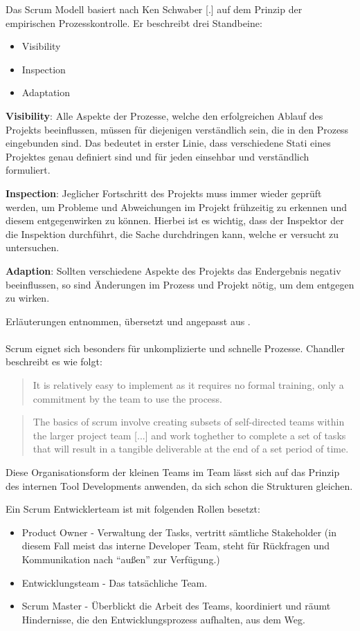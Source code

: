\documentclass[pagesize, paper=a4, fontsize=12pt, titlepage=true, headings=small, headnosepline, abstractoff, liststotoc, nochapterprefix, plainheadsepline, twoside]{scrreprt}
\begin{document}
Das Scrum Modell basiert nach Ken Schwaber [.] auf dem Prinzip der empirischen Prozesskontrolle. Er beschreibt drei Standbeine:
\begin{itemize}
\item Visibility
\item Inspection
\item Adaptation
\end{itemize}

\textbf{Visibility}: Alle Aspekte der Prozesse, welche den erfolgreichen Ablauf des Projekts beeinflussen, müssen für diejenigen verständlich sein, die in den Prozess eingebunden sind. Das bedeutet in erster Linie, dass verschiedene Stati eines Projektes genau definiert sind und für jeden einsehbar und verständlich formuliert. 

\textbf{Inspection}: Jeglicher Fortschritt des Projekts muss immer wieder geprüft werden, um Probleme und Abweichungen im Projekt frühzeitig zu erkennen und diesem entgegenwirken zu können. Hierbei ist es wichtig, dass der Inspektor der die Inspektion durchführt, die Sache durchdringen kann, welche er versucht zu untersuchen.

\textbf{Adaption}: Sollten verschiedene Aspekte des Projekts das Endergebnis negativ beeinflussen, so sind Änderungen im Prozess und Projekt nötig, um dem entgegen zu wirken.

Erläuterungen entnommen, übersetzt und angepasst aus .
\\
\\
Scrum eignet sich besonders für unkomplizierte und schnelle Prozesse. Chandler beschreibt es wie folgt:
\begin{quote}
\glqq It is relatively easy to implement as it requires no formal training, only a commitment by the team to use the process.\grqq{}
\cite[S. 45]{Chandler2006}
\end{quote}
\begin{quote}
\glqq The basics of scrum involve creating subsets of self-directed teams within the larger project team [...] and work toghether to complete a set of tasks that will result in a tangible deliverable at the end of a set period of time.\grqq{}
\cite[S. 45]{Chandler2006}
\end{quote}
Diese Organisationsform der kleinen Teams im Team lässt sich auf das Prinzip des internen Tool Developments anwenden, da sich schon die Strukturen gleichen.

Ein Scrum Entwicklerteam ist mit folgenden Rollen besetzt:
\begin{itemize}
\item Product Owner - Verwaltung der Tasks, vertritt sämtliche Stakeholder (in diesem Fall meist das interne Developer Team, steht für Rückfragen und Kommunikation nach “außen” zur Verfügung.)
\item Entwicklungsteam - Das tatsächliche Team.
\item Scrum Master - Überblickt die Arbeit des Teams, koordiniert und räumt Hindernisse, die den Entwicklungsprozess aufhalten, aus dem Weg.
\end{itemize}
\end{document}
